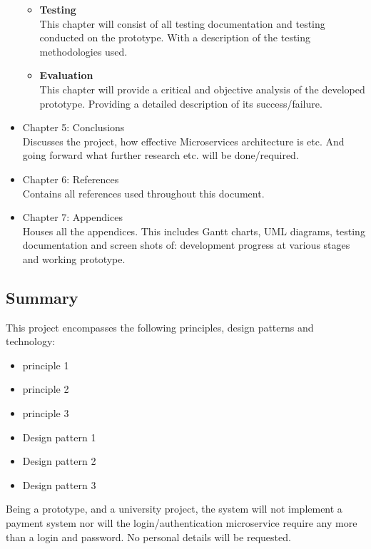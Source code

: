 \begin{itemize}
\begin{itemize}
					\item \textbf{Testing}
					\\This chapter will consist of all testing documentation and testing conducted on the prototype. With a description of the testing methodologies used.
					\item \textbf{Evaluation}
					\\This chapter will provide a critical and objective analysis of the developed prototype. Providing a detailed description of its success/failure.
				\end{itemize}
			\item Chapter 5: Conclusions
			\\Discusses the project, how effective Microservices architecture is etc. And going forward what further research etc. will be done/required.
			\item Chapter 6: References
			\\Contains all references used throughout this document.
			\item Chapter 7: Appendices
			\\Houses all the appendices. This includes Gantt charts, UML diagrams, testing documentation and screen shots of: development progress at various stages and working prototype.
		\end{itemize}
	\subsection{Summary}
	This project encompasses the following principles, design patterns and technology:
	\begin{itemize}
		\item principle 1
		\item principle 2
		\item principle 3
		\item Design pattern 1
		\item Design pattern 2
		\item Design pattern 3
	\end{itemize}
	Being a prototype, and a university project, the system will not implement a payment system nor will the login/authentication microservice require any more than a login and password. No personal details will be requested.